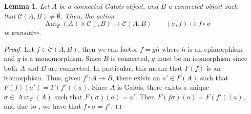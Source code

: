 \documentclass[10pt]{article}
\theoremstyle{thmstyle}
\newtheorem{lemma}[theorem]{Lemma}
\theoremstyle{defstyle}
\newcommand{\Aut}{\operatorname{Aut}}
\newcommand{\scrC}{\mathscr{C}} %
\begin{document}
\begin{lemma}
    Let $A$ be a connected Galois object, and $B$ a connected object such that $\scrC(A, B)\ne\emptyset$. Then, the action 
    \begin{equation*}
        \Aut_{\scrC}(A)\times\scrC(, B)\to\scrC(A, B)\qquad (\sigma, f)\mapsto f\circ\sigma
    \end{equation*}
    is transitive.
\end{lemma}
\begin{proof}
    Let $f\in\scrC(A, B)$, then we can factor $f = gh$ where $h$ is an epimorphism and $g$ is a monomorphism. Since $B$ is connected, $g$ must be an isomorphism since both $A$ and $B$ are connected. In particular, this means that $F(f)$ is an isomorphism. Thus, given $f': A\to B$, there exists an $a'\in F(A)$ such that $F(f)(a') = F(f')(a)$. Since $A$ is Galois, there exists a unique $\sigma\in\Aut_{\scrC}(A)$ such that $F(\sigma)(a) = a'$. Then $F(f\sigma)(a) = F(f')(a)$, and due to , we have that $f\circ\sigma = f'$.
\end{proof}
\end{document}
